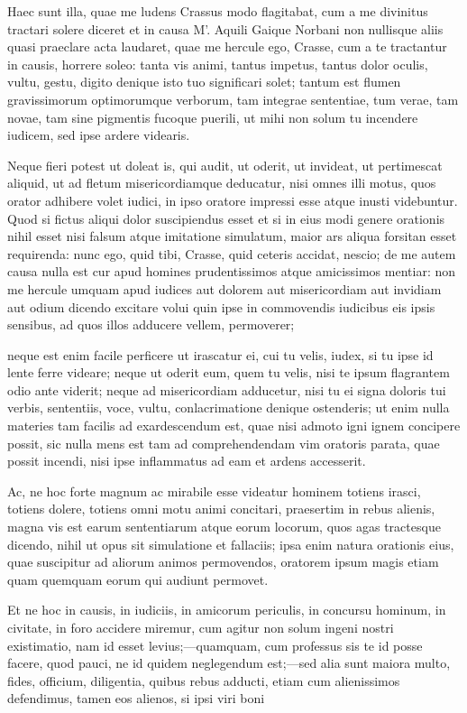  Haec sunt illa, quae me ludens Crassus modo flagitabat, cum a me divinitus tractari solere diceret et in causa M'. Aquili Gaique Norbani non nullisque aliis quasi praeclare acta laudaret, quae me hercule ego, Crasse, cum a te tractantur in causis, horrere soleo: tanta vis animi, tantus impetus, tantus dolor oculis, vultu, gestu, digito denique isto tuo significari solet; tantum est flumen gravissimorum optimorumque verborum, tam integrae sententiae, tum verae, tam novae, tam sine pigmentis fucoque puerili, ut mihi non solum tu incendere iudicem, sed ipse ardere videaris.

 Neque fieri potest ut doleat is, qui audit, ut oderit, ut invideat, ut pertimescat aliquid, ut ad fletum misericordiamque deducatur, nisi omnes illi motus, quos orator adhibere volet iudici, in ipso oratore impressi esse atque inusti videbuntur. Quod si fictus aliqui dolor suscipiendus esset et si in eius modi genere orationis nihil esset nisi falsum atque imitatione simulatum, maior ars aliqua forsitan esset requirenda: nunc ego, quid tibi, Crasse, quid ceteris accidat, nescio; de me autem causa nulla est cur apud homines prudentissimos atque amicissimos mentiar: non me hercule umquam apud iudices aut dolorem aut misericordiam aut invidiam aut odium dicendo excitare volui quin ipse in commovendis iudicibus eis ipsis sensibus, ad quos illos adducere vellem, permoverer;

 neque est enim facile perficere ut irascatur ei, cui tu velis, iudex, si tu ipse id lente ferre videare; neque ut oderit eum, quem tu velis, nisi te ipsum flagrantem odio ante viderit; neque ad misericordiam adducetur, nisi tu ei signa doloris tui verbis, sententiis, voce, vultu, conlacrimatione denique ostenderis; ut enim nulla materies tam facilis ad exardescendum est, quae nisi admoto igni ignem concipere possit, sic nulla mens est tam ad comprehendendam vim oratoris parata, quae possit incendi, nisi ipse inflammatus ad eam et ardens accesserit.

 Ac, ne hoc forte magnum ac mirabile esse videatur hominem totiens irasci, totiens dolere, totiens omni motu animi concitari, praesertim in rebus alienis, magna vis est earum sententiarum atque eorum locorum, quos agas tractesque dicendo, nihil ut opus sit simulatione et fallaciis; ipsa enim natura orationis eius, quae suscipitur ad aliorum animos permovendos, oratorem ipsum magis etiam quam quemquam eorum qui audiunt permovet.

 Et ne hoc in causis, in iudiciis, in amicorum periculis, in concursu hominum, in civitate, in foro accidere miremur, cum agitur non solum ingeni nostri existimatio, nam id esset levius;—quamquam, cum professus sis te id posse facere, quod pauci, ne id quidem neglegendum est;—sed alia sunt maiora multo, fides, officium, diligentia, quibus rebus adducti, etiam cum alienissimos defendimus, tamen eos alienos, si ipsi viri boni

